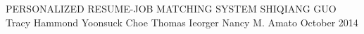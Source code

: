 \approvalfour
{PERSONALIZED RESUME-JOB MATCHING SYSTEM
}
{SHIQIANG GUO}%
{Tracy Hammond
}
{Yoonsuck  Choe  
}
{Thomas Ieorger 
}
{Nancy M. Amato}
{October 2014}%

%
%

